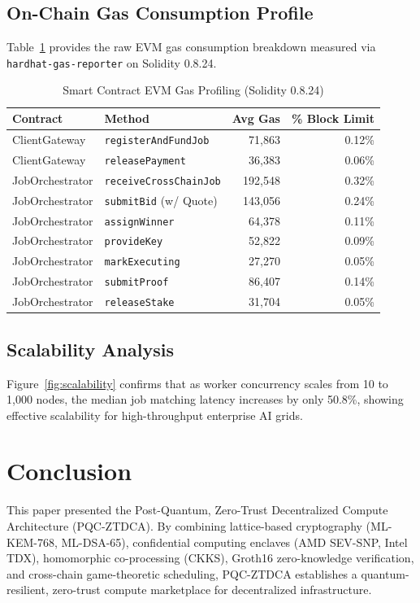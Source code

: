 \documentclass[conference]{IEEEtran}
\begin{document}
\subsection{On-Chain Gas Consumption Profile}
Table~\ref{tab:gas} provides the raw EVM gas consumption breakdown measured via \texttt{hardhat-gas-reporter} on Solidity 0.8.24.

\begin{table}[htbp]
\caption{Smart Contract EVM Gas Profiling (Solidity 0.8.24)}
\label{tab:gas}
\centering
\begin{tabular}{llrr}
\toprule
\textbf{Contract} & \textbf{Method} & \textbf{Avg Gas} & \textbf{\% Block Limit} \\
\midrule
ClientGateway   & \texttt{registerAndFundJob}   & 71,863  & 0.12\% \\
ClientGateway   & \texttt{releasePayment}       & 36,383  & 0.06\% \\
JobOrchestrator & \texttt{receiveCrossChainJob} & 192,548 & 0.32\% \\
JobOrchestrator & \texttt{submitBid} (w/ Quote) & 143,056 & 0.24\% \\
JobOrchestrator & \texttt{assignWinner}         & 64,378  & 0.11\% \\
JobOrchestrator & \texttt{provideKey}           & 52,822  & 0.09\% \\
JobOrchestrator & \texttt{markExecuting}        & 27,270  & 0.05\% \\
JobOrchestrator & \texttt{submitProof}          & 86,407  & 0.14\% \\
JobOrchestrator & \texttt{releaseStake}         & 31,704  & 0.05\% \\
\bottomrule
\end{tabular}
\end{table}

\subsection{Scalability Analysis}
Figure~\ref{fig:scalability} confirms that as worker concurrency scales from 10 to 1,000 nodes, the median job matching latency increases by only 50.8\%, showing effective scalability for high-throughput enterprise AI grids.

\section{Conclusion}
This paper presented the Post-Quantum, Zero-Trust Decentralized Compute Architecture (PQC-ZTDCA). By combining lattice-based cryptography (ML-KEM-768, ML-DSA-65), confidential computing enclaves (AMD SEV-SNP, Intel TDX), homomorphic co-processing (CKKS), Groth16 zero-knowledge verification, and cross-chain game-theoretic scheduling, PQC-ZTDCA establishes a quantum-resilient, zero-trust compute marketplace for decentralized infrastructure.



\end{document}
